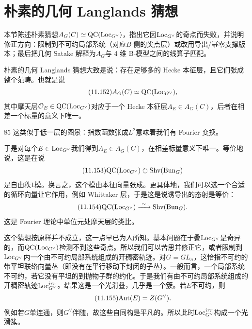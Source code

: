 \section{朴素的几何 Langlands 猜想}\label{sec:11-8}

\begin{sectionkey}
本节陈述朴素猜想$A_G(C)\simeq\mathrm{QC}(\mathrm{Loc}_{G^{\vee}})$，指出它因$\mathrm{Loc}_{G^{\vee}}$的奇点而失败，并说明修正方向：限制到不可约局部系统（对应$B$-侧的尖点层）或改用导出/幂零支撑版本；最后把几何 Satake 解释为$A_G$与 4 维 B-模型之间的线算子匹配。
\end{sectionkey}

朴素的几何 Langlands 猜想大致是说：存在足够多的 Hecke 本征层，且它们张成整个范畴。也就是说
\begin{equation}\tag{11.152}
A_G(C)\simeq\mathrm{QC}(\mathrm{Loc}_{G^{\vee}}),
\end{equation}
其中摩天层$\mathcal{O}_E\in\mathrm{QC}(\mathrm{Loc}_{G^{\vee}})$对应于一个 Hecke 本征层$A_E\in A_G(C)$，后者在相差一个标量的意义下唯一。

\begin{srcrem}{85}
这类似于低一层的图景：指数函数张成$L^{2}$意味着我们有 Fourier 变换。
\end{srcrem}

于是对每个$E\in\mathrm{Loc}_{G^{\vee}}$我们得到$A_E\in A_G(C)$，在相差标量意义下唯一。等价地说，这是在说
\begin{equation}\tag{11.153}
\mathrm{QC}(\mathrm{Loc}_{G^{\vee}})\circlearrowright\mathrm{Shv}(\mathrm{Bun}_G)
\end{equation}
是自由秩$1$模。换言之，这个模由本征向量张成。更具体地，我们可以选一个合适的循环向量让它作用，例如 Whittaker 层，于是这是说诱导出的态射是等价：
\begin{equation}\tag{11.154}
\mathrm{QC}(\mathrm{Loc}_{G^{\vee}})\xrightarrow{\ \sim\ }\mathrm{Shv}(\mathrm{Bun}_G).
\end{equation}
这是 Fourier 理论中单位元处摩天层的类比。

这个猜想按原样并不成立，这一点早已为人所知。基本问题在于叠$\mathrm{Loc}_{G^{\vee}}$是奇异的，而$\mathrm{QC}(\mathrm{Loc}_{G^{\vee}})$检测不到这些奇点。所以我们可以苦思并修正它，或者限制到$\mathrm{Loc}_{G^{\vee}}$内一个由不可约局部系统组成的开稠密轨迹。对$G=GL_n$，这恰指不可约的带平坦联络向量丛（即没有在平行移动下封闭的子丛）。一般而言，一个局部系统不可约，若它没有平坦的到抛物子群的约化。于是我们有由不可约局部系统组成的开稠密轨迹$\mathrm{Loc}^{irr}_{G^{\vee}}$。结果这是一个光滑叠，几乎是一个簇。若$E$不可约，则
\begin{equation}\tag{11.155}
\mathrm{Aut}(E)=Z(G^{\vee}).
\end{equation}
例如若$G$单连通，则$G^{\vee}$伴随，故这些自同构是平凡的。所以此时$\mathrm{Loc}^{irr}_{G^{\vee}}$构成一个光滑簇。

